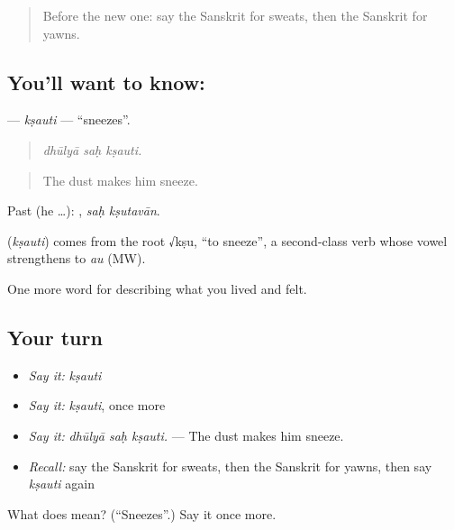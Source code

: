 \begin{quote}
Before the new one: say the Sanskrit for sweats, then the Sanskrit for yawns.
\end{quote}

\subsection*{You'll want to know: }
\textbf{} — \emph{kṣauti} — \textquotedblleft{}sneezes\textquotedblright{}.

\begin{quote}
  
\end{quote}

\begin{quote}
\emph{dhūlyā saḥ kṣauti.}
\end{quote}

\begin{quote}
The dust makes him sneeze.
\end{quote}

Past (he …):  , \emph{saḥ kṣutavān}.

\begin{cousinweb}
\textbf{} (\emph{kṣauti}) comes from the root √kṣu, \textquotedblleft{}to sneeze\textquotedblright{}, a second-class verb whose vowel strengthens to \emph{au} (MW).
\end{cousinweb}

\begin{grammarlens}[title={What you've built}]
One more word for describing what you lived and felt.
\end{grammarlens}

\subsection*{Your turn}
\begin{itemize}
\raggedright
  \item \emph{Say it:} \emph{kṣauti}
  \item \emph{Say it:} \emph{kṣauti}, once more
  \item \emph{Say it:} \emph{dhūlyā saḥ kṣauti.} — The dust makes him sneeze.
  \item \emph{Recall:} say the Sanskrit for sweats, then the Sanskrit for yawns, then say \emph{kṣauti} again
\end{itemize}

\begin{tcolorbox}[breakable,colback=teal!4,colframe=teal!35!black,title={Before you move on}]
What does  mean? (\textquotedblleft{}Sneezes\textquotedblright{}.) Say it once more.
\end{tcolorbox}
